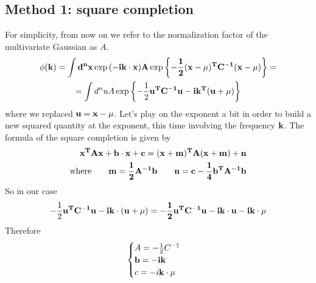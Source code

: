 \documentclass[a4paper,11pt,fleqn]{article}
\begin{document}
\subsection{Method 1: square completion}
For simplicity, from now on we refer to the normalization factor of the multivariate Gaussian as $A$.
\begin{gather*}
    \phi(\bf{k}) = \int d^nx \exp{(-i\bf{k}\cdot \bf{x}) A \exp{\left\{-\frac{1}{2}(\bf{x}-\bf{\mu})^T C^{-1} (\bf{x}-\bf{\mu})\right\}}} = \\
    = \int d^n u A \exp{\left\{ -\frac{1}{2}\bf{u}^TC^{-1}\bf{u} - i\bf{k}^T(\bf{u}+\bf{\mu}) \right\}}
\end{gather*}
where we replaced $\bf{u} = \bf{x}-\bf{\mu}$. Let's play on the exponent a bit in order to build a new squared
quantity at the exponent, this time involving the frequency $\bf{k}$. The formula of the square completion is given by
\begin{align}
    \label{eqn:square_completion}
    \bf{x}^T A \bf{x} + \bf{b}\cdot \bf{x} + c = (\bf{x}+\bf{m})^TA(\bf{x}+\bf{m})+\bf{n} \\
    \textnormal{where} \qquad \bf{m} = \frac{1}{2}A^{-1}\bf{b} \qquad \bf{n} = c -\frac{1}{4}\bf{b}^TA^{-1}\bf{b}
\end{align}
So in our case
\begin{multline*}
   -\frac{1}{2}\bf{u}^T C^{-1}\bf{u} - i\bf{k} \cdot (\bf{u}+\bf{\mu}) = -\frac{1}{2}\bf{u}^TC^{-1}\bf{u} - i \bf{k}\cdot \bf{u} -i \bf{k}\cdot \bf{\mu}
\end{multline*}
Therefore
\begin{equation*}
    \begin{cases}
        A = -\frac{1}{2}C^{-1} \\
        \bf{b} = -i\bf{k} \\
        c = -i\bf{k}\cdot \bf{\mu}
    \end{cases}
\end{equation*}
\end{document}
